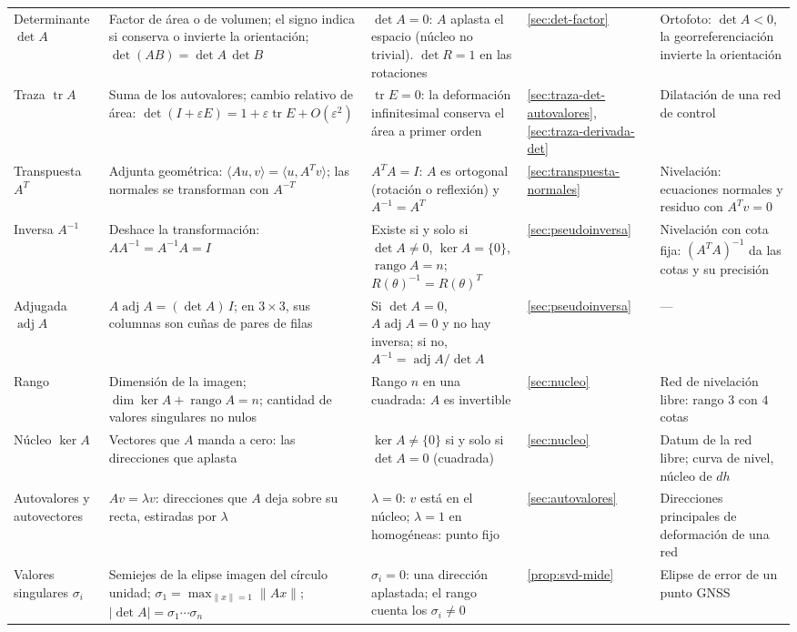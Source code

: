 \begin{table}[p]
\begin{tabularx}{\textwidth}{@{}>{\raggedright\arraybackslash}p{23mm}YY>{\centering\arraybackslash}p{10mm}>{\raggedright\arraybackslash}p{31mm}@{}}
Determinante \(\det A\) & Factor de área o de volumen; el signo indica si conserva o invierte la orientación; \(\det(AB)=\det A\,\det B\) & \(\det A=0\): \(A\) aplasta el espacio (núcleo no trivial). \(\det R=1\) en las rotaciones & \ref{sec:det-factor} & Ortofoto: \(\det A<0\), la georreferenciación invierte la orientación\\
Traza \(\operatorname{tr}A\) & Suma de los autovalores; cambio relativo de área: \(\det(I+\varepsilon E)=1+\varepsilon\operatorname{tr}E+O(\varepsilon^2)\) & \(\operatorname{tr}E=0\): la deformación infinitesimal conserva el área a primer orden & \ref{sec:traza-det-autovalores}, \ref{sec:traza-derivada-det} & Dilatación de una red de control\\
Transpuesta \(A^T\) & Adjunta geométrica: \(\langle Au,v\rangle=\langle u,A^Tv\rangle\); las normales se transforman con \(A^{-T}\) & \(A^TA=I\): \(A\) es ortogonal (rotación o reflexión) y \(A^{-1}=A^T\) & \ref{sec:transpuesta-normales} & Nivelación: ecuaciones normales y residuo con \(A^Tv=0\)\\
Inversa \(A^{-1}\) & Deshace la transformación: \(AA^{-1}=A^{-1}A=I\) & Existe si y solo si \(\det A\neq0\), \(\ker A=\{0\}\), \(\operatorname{rango}A=n\); \(R(\theta)^{-1}=R(\theta)^T\) & \ref{sec:pseudoinversa} & Nivelación con cota fija: \((A^TA)^{-1}\) da las cotas y su precisión\\
Adjugada \(\operatorname{adj}A\) & \(A\operatorname{adj}A=(\det A)\,I\); en \(3\times3\), sus columnas son cuñas de pares de filas & Si \(\det A=0\), \(A\operatorname{adj}A=0\) y no hay inversa; si no, \(A^{-1}=\operatorname{adj}A/\det A\) & \ref{sec:pseudoinversa} & ---\\
Rango & Dimensión de la imagen; \(\dim\ker A+\operatorname{rango}A=n\); cantidad de valores singulares no nulos & Rango \(n\) en una cuadrada: \(A\) es invertible & \ref{sec:nucleo} & Red de nivelación libre: rango \(3\) con \(4\) cotas\\
Núcleo \(\ker A\) & Vectores que \(A\) manda a cero: las direcciones que aplasta & \(\ker A\neq\{0\}\) si y solo si \(\det A=0\) (cuadrada) & \ref{sec:nucleo} & Datum de la red libre; curva de nivel, núcleo de \(dh\)\\
Autovalores y autovectores & \(Av=\lambda v\): direcciones que \(A\) deja sobre su recta, estiradas por \(\lambda\) & \(\lambda=0\): \(v\) está en el núcleo; \(\lambda=1\) en homogéneas: punto fijo & \ref{sec:autovalores} & Direcciones principales de deformación de una red\\
Valores singulares \(\sigma_i\) & Semiejes de la elipse imagen del círculo unidad; \(\sigma_1=\max_{\lVert x\rVert=1}\lVert Ax\rVert\); \(\lvert\det A\rvert=\sigma_1\cdots\sigma_n\) & \(\sigma_i=0\): una dirección aplastada; el rango cuenta los \(\sigma_i\neq0\) & \ref{prop:svd-mide} & Elipse de error de un punto GNSS\\

\end{tabularx}
\end{table}
